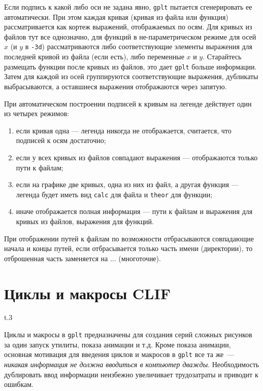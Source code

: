 \documentclass[12pt]{article}
\def\gplt{{\tt gplt}}
\begin{document}
Если подпись к какой либо оси не задана явно, \gplt{} пытается сгенерировать ее автоматически.
При этом каждая кривая (кривая из файла или функция) рассматривается как кортеж выражений, отображаемых по осям.
Для кривых из файлов тут все однозначно, для функций в не-параметрическом режиме для осей $x$ (и $y$ в \verb'-3d')
рассматриваются либо соответствующие элементы выражения для последней кривой из файла (если есть), либо 
переменные $x$ и $y$. Старайтесь размещать функции после кривых из файлов, это дает \gplt{} больше информации.
Затем для каждой из осей группируются соответствующие выражения, дубликаты выбрасываются, а оставшиеся выражения отображаются через запятую.

При автоматическом построении подписей к кривым на легенде действует один из четырех режимов:
\begin{enumerate}
\item если кривая одна --- легенда никогда не отображается, считается, что подписей к осям достаточно;
\item если у всех кривых из файлов совпадают выражения --- отображаются только пути к файлам;
\item если на графике две кривых, одна из них из файл, а другая функция --- легенда будет иметь вид \verb'calc' для файла и \verb'theor' для функции;
\item иначе отображается полная информация --- пути к файлам и выражения для кривых из файлов, выражения для функций.
\end{enumerate}
При отображении путей к файлам по возможности отбрасываются совпадающие начала и концы путей, если отбрасывается только часть имени (директории),
то отброшенная часть заменяется на ...
(многоточие).

\section{Циклы и макросы CLIF}\label{clif:sec}
\begin{wrapfigure}[7]{t}{.3\textwidth}
  \vphantom{.}
  \vspace{-3cm}

\end{wrapfigure}
Циклы и макросы в \gplt{} предназначены для создания серий сложных рисунков за один запуск утилиты, показа анимации и т.д.
Кроме показа анимации, основная мотивация для введения циклов и макросов в \gplt{} все та же~--- {\it никакая информация не должна вводиться в компьютер дважды}.
Необходимость дублировать ввод информации неизбежно увеличивает трудозатраты и приводит к ошибкам.
\end{document}
